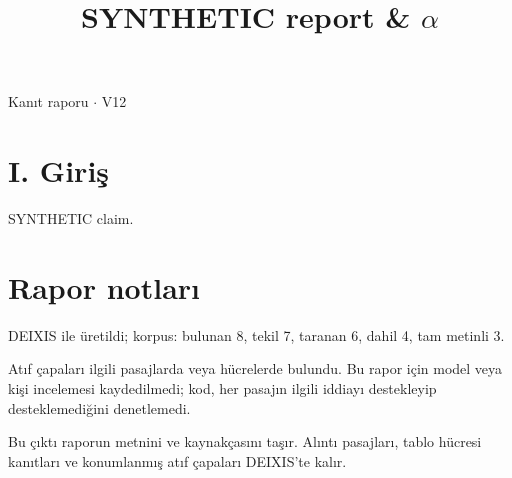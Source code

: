 \documentclass[journal]{IEEEtran}
\begin{document}
\renewcommand{\abstractname}{Özet}
\renewcommand{\IEEEkeywordsname}{Dizin Terimleri}
\renewcommand{\refname}{Kaynaklar}

\title{SYNTHETIC report \& \ensuremath{\alpha}}

\maketitle

\noindent Kanıt raporu \ensuremath{\cdot} V12

\section*{I. Giriş}

SYNTHETIC claim. \cite{Synth26}

\section*{Rapor notları}

DEIXIS ile üretildi; korpus: bulunan 8, tekil 7, taranan 6, dahil 4, tam metinli 3.

Atıf çapaları ilgili pasajlarda veya hücrelerde bulundu. Bu rapor için model veya kişi incelemesi kaydedilmedi; kod, her pasajın ilgili iddiayı destekleyip desteklemediğini denetlemedi.

Bu çıktı raporun metnini ve kaynakçasını taşır. Alıntı pasajları, tablo hücresi kanıtları ve konumlanmış atıf çapaları DEIXIS'te kalır.




\end{document}
